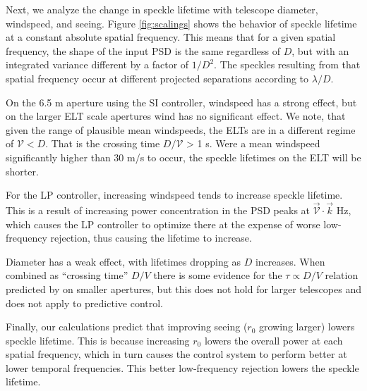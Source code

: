 \documentclass[10pt,preprint]{aastex631}
\begin{document}
Next, we analyze the change in speckle lifetime with telescope diameter, windspeed, and seeing.  Figure \ref{fig:scalings} shows the behavior of speckle lifetime at a constant absolute spatial frequency.  This means that for a given spatial frequency, the shape of the input PSD is the same regardless of $D$, but with an integrated variance different by a factor of $1/D^2$.  The speckles resulting from that spatial frequency occur at different projected separations according to $\lambda/D$.  

On the 6.5 m aperture using the SI controller, windspeed has a strong effect, but on the larger ELT scale apertures wind has no significant effect.  We note, that given the range of plausible mean windspeeds, the ELTs are in a different regime of $\mathcal{V} < D$.  That is the crossing time $D/\mathcal{V}$ > 1 s.  Were a mean windspeed significantly higher than 30 m/s to occur, the speckle lifetimes on the ELT will be shorter.   

For the LP controller, increasing windspeed tends to increase speckle lifetime.  This is a result of increasing power concentration in the PSD peaks at $\vec{\mathcal{V}} \cdot \vec{k}$ Hz, which causes the LP controller to optimize there at the expense of worse low-frequency rejection, thus causing the lifetime to increase.

Diameter has a weak effect, with lifetimes dropping as $D$ increases.  When combined as ``crossing time'' $D/V$ there is some evidence for the $\tau \propto D/V$ relation predicted by \citet{2005SPIE.5903..170M} on smaller apertures, but this does not hold for larger telescopes and does not apply to predictive control.  

Finally, our calculations predict that improving seeing ($r_0$ growing larger) lowers speckle lifetime.  This is because increasing $r_0$ lowers the overall power at each spatial frequency, which in turn causes the control system to perform better at lower temporal frequencies.  This better low-frequency rejection lowers the speckle lifetime.
\end{document}
